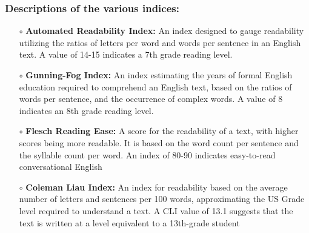 \subsubsection{Descriptions of the various indices:}
\begin{itemize}
    \item[$\scriptstyle\circ$] \textbf{Automated Readability Index: }An index designed to gauge readability utilizing the ratios of letters per word and words per sentence in an English text. A value of 14-15 indicates a 7th grade reading level. 
    \item[$\scriptstyle\circ$] \textbf{Gunning-Fog Index: }An index estimating the years of formal English education required to comprehend an English text, based on the ratios of words per sentence, and the occurrence of complex words. A value of 8 indicates an 8th grade reading level. 
    \item[$\scriptstyle\circ$] \textbf{Flesch Reading Ease: }A score for the readability of a text, with higher scores being more readable. It is based on the word count per sentence and the syllable count per word. An index of 80-90 indicates easy-to-read conversational English
    \item[$\scriptstyle\circ$] \textbf{Coleman Liau Index: }An index for readability based on the average number of letters and sentences per 100 words, approximating the US Grade level required to understand a text. A CLI value of 13.1 suggests that the text is written at a level equivalent to a 13th-grade student
    
    
\end{itemize}

